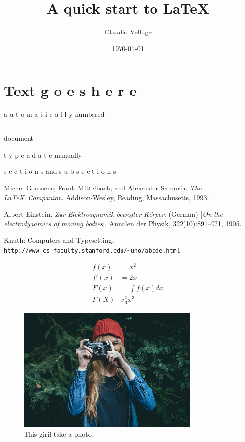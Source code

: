 \documentclass{article}
\begin{document}
\section{Text g o e s h e r e } 
a u t o m a t i c a l l y numbered
\subsection{}
\subsubsection{}
\paragraph {} 
\subparagraph {}
\author{ Claudio Vellage } 
\title{A quick start to \LaTeX{}} 
document
\date{\today{}} 
t y p e a d a t e manually
\maketitle{} 
\tableofcontents {} 
s e c t i o n s and s u b s e c t i o n s
\\ 
\newpage{} 

\begin{thebibliography}{9}
Michel Goossens, Frank Mittelbach, and Alexander Samarin. 
\textit{The \LaTeX\ Companion}. 
Addison-Wesley, Reading, Massachusetts, 1993.
 
Albert Einstein. 
\textit{Zur Elektrodynamik bewegter K{\"o}rper}. (German) 
[\textit{On the electrodynamics of moving bodies}]. 
Annalen der Physik, 322(10):891–921, 1905.
 
Knuth: Computers and Typesetting,
\\\texttt{http://www-cs-faculty.stanford.edu/\~{}uno/abcde.html}
\end{thebibliography}

\begin{align}
f(x) &= x^2\\
f'(x) &= 2x\\
F(x) &= \int f(x)dx\\
F(X) &x \frac{x}{3}x^3
\end{align}

\begin{figure}
\includegraphics[width=0.8\textwidth]{picture/aa.jpg}
\caption{This giril take a photo.}
\end{figure}
\end{document}
